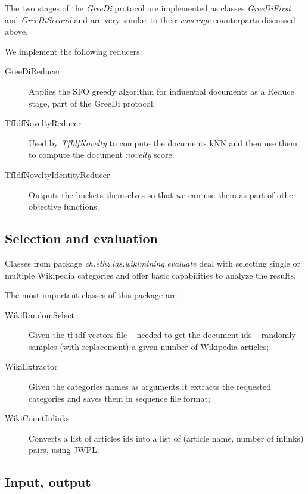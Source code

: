 The two stages of the \emph{GreeDi} protocol are implemented as classes
\emph{GreeDiFirst} and \emph{GreeDiSecond} and are very similar to their
\emph{coverage} counterparts discussed above.

We implement the following reducers:
\begin{description}
  \item[GreeDiReducer] Applies the \ac{SFO} greedy algorithm for influential
  documents as a Reduce stage, part of the GreeDi protocol;
  \item[TfIdfNoveltyReducer] Used by \emph{TfIdfNovelty} to compute the
  documents \ac{kNN} and then use them to compute the document \emph{novelty}
  score;
  \item[TfIdfNoveltyIdentityReducer] Outputs the buckets themselves so that we
  can use them as part of other objective functions.
\end{description}

\subsection{Selection and evaluation}

Classes from  package \emph{ch.ethz.las.wikimining.evaluate} deal with
selecting single or multiple Wikipedia categories and offer basic capabilities
to analyze the results.

The most important classes of this package are:
\begin{description}
  \item[WikiRandomSelect] Given the tf-idf vectors file -- needed to get the
  document ids -- randomly samples (with replacement) a given number of
  Wikipedia articles;
  \item[WikiExtractor] Given the categories names as arguments it extracts the
  requested categories and saves them in sequence file format;
  \item[WikiCountInlinks] Converts a list of articles ids into a list of
  (article name, number of inlinks) pairs, using \ac{JWPL}.
\end{description}

\subsection{Input, output}

